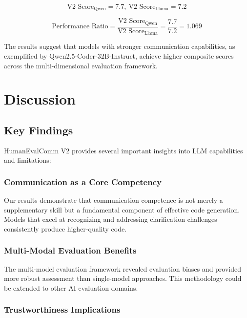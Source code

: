 \documentclass[conference]{IEEEtran}
\begin{document}
\begin{equation}
\text{V2 Score}_{\text{Qwen}} = 7.7,\ \text{V2 Score}_{\text{Llama}} = 7.2
\end{equation}

\begin{equation}
\text{Performance Ratio} = \frac{\text{V2 Score}_{\text{Qwen}}}{\text{V2 Score}_{\text{Llama}}} = \frac{7.7}{7.2} = 1.069
\end{equation}

The results suggest that models with stronger communication capabilities, as exemplified by Qwen2.5-Coder-32B-Instruct, achieve higher composite scores across the multi-dimensional evaluation framework.

\section{Discussion}

\subsection{Key Findings}

HumanEvalComm V2 provides several important insights into LLM capabilities and limitations:

\subsubsection{Communication as a Core Competency}

Our results demonstrate that communication competence is not merely a supplementary skill but a fundamental component of effective code generation. Models that excel at recognizing and addressing clarification challenges consistently produce higher-quality code.

\subsubsection{Multi-Modal Evaluation Benefits}

The multi-model evaluation framework revealed evaluation biases and provided more robust assessment than single-model approaches. This methodology could be extended to other AI evaluation domains.

\subsubsection{Trustworthiness Implications}
\end{document}

